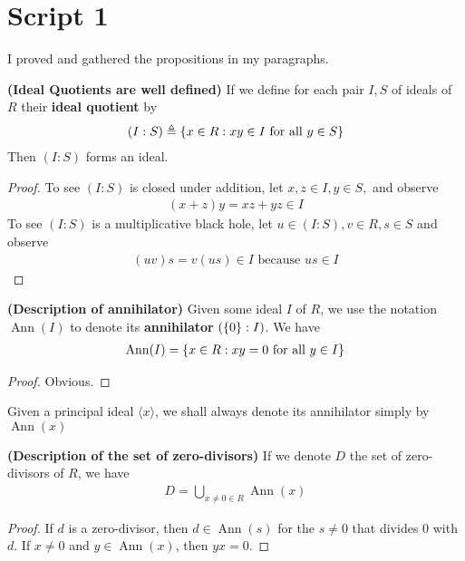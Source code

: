 \documentclass{report}
\begin{document}
\section{Script 1}

I proved and gathered the propositions in my paragraphs. 
\begin{theorem}
\textbf{(Ideal Quotients are well defined)} If we define for each pair $I,S$ of ideals of $R$ their \textbf{ideal quotient} by
\begin{align*}
  (I:S)\triangleq \{ x\in R: xy \in I\text{ for all }y \in S  \}
\end{align*}
Then $(I:S)$ forms an ideal.  
\end{theorem}
\begin{proof}
To see $(I:S)$ is closed under addition, let $x,z \in I,y \in S,$ and observe 
\begin{align*}
  (x+z)y=xz+yz \in I
\end{align*}
To see $(I:S)$ is a multiplicative black hole, let $u \in (I:S),v \in R,s \in S$ and observe 
\begin{align*}
  (uv)s=v(us)\in I\text{ because }us \in I
\end{align*}
\end{proof}
\begin{theorem}
\textbf{(Description of annihilator)} Given some ideal $I$ of $R$, we use the notation $\operatorname{Ann}(I)$ to denote its \textbf{annihilator} $(\{ 0 \}:I)$. We have 
\begin{align*}
\operatorname{Ann}(I)=\{ x\in R: xy=0\text{ for all }y \in I \}
\end{align*}
\end{theorem}
\begin{proof}
Obvious.
\end{proof}
\begin{mdframed}
Given a principal ideal $\langle x\rangle $, we shall always denote its annihilator simply by $\operatorname{Ann}(x)$
\end{mdframed}
\begin{theorem}
\textbf{(Description of the set of zero-divisors)} If we denote  $D$ the set of zero-divisors of $R$, we have 
\begin{align*}
D = \bigcup_{x\neq 0 \in R} \operatorname{Ann}(x )
\end{align*}
\end{theorem}
\begin{proof}
If $d$ is a zero-divisor, then $d \in \operatorname{Ann}(s)$ for the $s\neq 0$ that divides $0$ with  $d$.  If $x\neq 0$ and $y \in \operatorname{Ann}(x)$, then $yx=0$.  
\end{proof}
\end{document}
